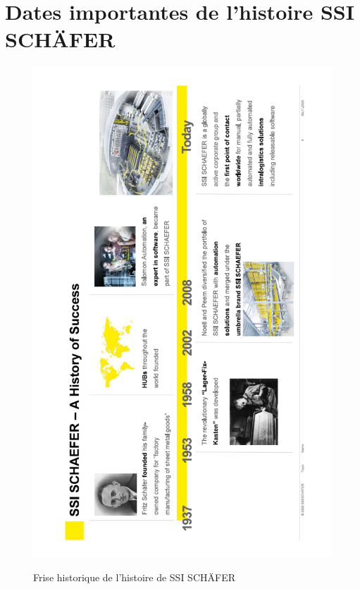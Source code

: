 \documentclass[a4paper, 12pt, french]{article}
\begin{document}
		\newpage

		\section{Dates importantes de l'histoire SSI SCHÄFER}\label{appendix:history}
			\begin{figure}[h!]
				\begin{center}
					\includegraphics[width=0.7\linewidth]{images/history.png}
					\caption{Frise historique de l'histoire de SSI SCHÄFER}%
					\label{fig:history}
				\end{center}
			\end{figure}

		\newpage
\end{document}
